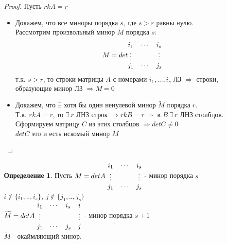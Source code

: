 \documentclass[a4paper, 12pt]{article}
\theoremstyle{definition}
\newtheorem*{definition}{Определение}
\begin{document}
  \begin{proof}
    Пусть $rkA = r$ 
    \begin{itemize}
      \item Докажем, что все миноры порядка $s$, где $s>r$ равны нулю. \\
      Рассмотрим произвольный минор $M$ порядка $s$: $$M = det\begin{matrix}
        i_1 & \cdots & i_s \\
        \vdots & \null & \vdots \\
        j_1 & \cdots & j_s
      \end{matrix}$$ 
      т.к. $s>r$, то строки матрицы $A$ с номерами $i_1,...,i_s$ ЛЗ $\Longrightarrow $ строки, образующие минор ЛЗ $\Longrightarrow M=0$ 
      \item Докажем, что $\exists$ хотя бы один ненулевой минор $\widetilde{M}$ порядка $r$. \\
      Т.к. $rkA = r$, то $\exists \ r$ ЛНЗ строк $\Longrightarrow rkB = r \Longrightarrow $ в $B \ \exists \ r $ ЛНЗ столбцов. Сформируем матрицу $C$ из этих столбцов $\Longrightarrow detC \not = 0$ \\
      $detC$ это и есть искомый минор $\widetilde{M}$     
    \end{itemize}
  \end{proof} 
  \begin{definition}
     Пусть $M = detA \ \begin{matrix}
      i_1 & \cdots & i_s \\
      \vdots & \null & \vdots \\
      j_1 & \cdots & j_s
    \end{matrix}$ - минор порядка $s$ \\
    $i \not \in \{i_1,..,i_s\}, \ j \not \in \{j_1,..,j_s\}$ \vspace{0.3cm}\\
    $\widetilde{M} = detA \ \begin{matrix}
      i_1 & \cdots & i_s & i \\
      \vdots & \null & \null & \vdots \\
      j_1 & \cdots & j_s & j
    \end{matrix}$ - минор порядка  $s+1$ \\
    $\widetilde{M}$ - окаймляющий минор.  
  \end{definition} 
\end{document}
